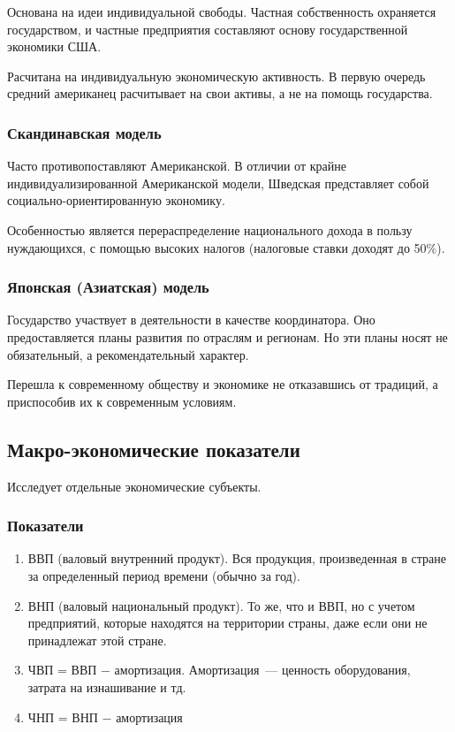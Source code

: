 \documentclass[12pt]{article}
\begin{document}
	Основана на идеи индивидуальной свободы. Частная собственность охраняется государством, и частные предприятия составляют основу государственной экономики США.
	
	Расчитана на индивидуальную экономическую активность. В первую очередь средний американец расчитывает на свои активы, а не на помощь государства.
	
	\subsubsection{Скандинавская модель}
	
	Часто противопоставляют Американской. В отличии от крайне индивидуализированной Американской модели, Шведская представляет собой социально-ориентированную экономику.
	
	Особенностью является перераспределение национального дохода в пользу нуждающихся, с помощью высоких налогов (налоговые ставки доходят до 50\%).
	
	\subsubsection{Японская (Азиатская) модель}
	
	Государство участвует в деятельности в качестве координатора. Оно предоставляется планы развития по отраслям и регионам. Но эти планы носят не обязательный, а рекомендательный характер.
	
	Перешла к современному обществу и экономике не отказавшись от традиций, а приспособив их к современным условиям.
	
	\subsection{Макро-экономические показатели}
	
	\begin{definition}
		Исследует отдельные экономические субъекты.
	\end{definition}
	
	\subsubsection{Показатели}
	
	\begin{enumerate}
		\item ВВП (валовый внутренний продукт). Вся продукция, произведенная в стране за определенный период времени (обычно за год).
		\item ВНП (валовый национальный продукт). То же, что и ВВП, но с учетом предприятий, которые находятся на территории страны, даже если они не принадлежат этой стране.
		\item ЧВП = ВВП $-$ амортизация. Амортизация~--- ценность оборудования, затрата на изнашивание и тд.
		\item ЧНП = ВНП $-$ амортизация
	\end{enumerate}
	
\end{document}
